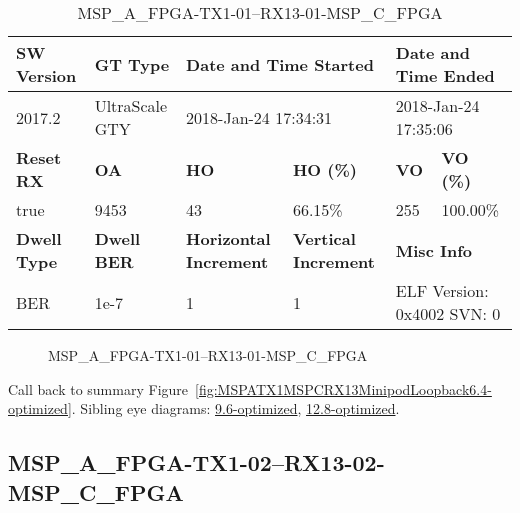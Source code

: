 \begin{table}[h]
\centering
\caption{MSP\_A\_FPGA-TX1-01--RX13-01-MSP\_C\_FPGA}
\label{tab:MSPAFPGATX101RX1301MSPCFPGA6.4-optimized}
\begin{tabular}{@{}|l|l|l|l|l|l|@{}}
\toprule
\textbf{SW Version}                & \textbf{GT Type}   & \multicolumn{2}{l|}{\textbf{Date and Time Started}}            & \multicolumn{2}{l|}{\textbf{Date and Time Ended}}        \\ \midrule
2017.2                       & UltraScale GTY          & \multicolumn{2}{l|}{2018-Jan-24 17:34:31}                   & \multicolumn{2}{l|}{2018-Jan-24 17:35:06}               \\ \midrule
\textbf{Reset RX}                  & \textbf{OA} & \textbf{HO}   & \textbf{HO (\%)} & \textbf{VO} & \textbf{VO (\%)} \\ \midrule
true & 9453        & 43          & 66.15\%        & 255        & 100.00\%       \\ \midrule
\textbf{Dwell Type}                & \textbf{Dwell BER} & \textbf{Horizontal Increment} & \textbf{Vertical Increment}    & \multicolumn{2}{l|}{\textbf{Misc Info}}                  \\ \midrule
BER                            & 1e-7        & 1        & 1           & \multicolumn{2}{l|}{ELF Version: 0x4002 SVN: 0}                         \\ \bottomrule
\end{tabular}
\end{table}

\begin{figure}[h]
\caption{MSP\_A\_FPGA-TX1-01--RX13-01-MSP\_C\_FPGA} \label{fig:MSPAFPGATX101RX1301MSPCFPGA6.4-optimized}
\end{figure}

Call back to summary Figure~\ref{fig:MSPATX1MSPCRX13MinipodLoopback6.4-optimized}.
Sibling eye diagrams: \hyperref[sec:MSPAFPGATX101RX1301MSPCFPGA9.6-optimized]{9.6-optimized}, \hyperref[sec:MSPAFPGATX101RX1301MSPCFPGA12.8-optimized]{12.8-optimized}.

\clearpage
\newpage


\subsection{MSP\_A\_FPGA-TX1-02--RX13-02-MSP\_C\_FPGA}\label{sec:MSPAFPGATX102RX1302MSPCFPGA6.4-optimized}

